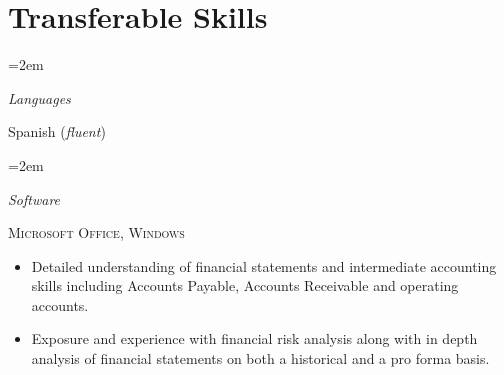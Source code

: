 \documentclass[paper=a4,fontsize=10pt]{scrartcl} %
\newlength{\spacebox}
\newcommand{\PersonalEntry}[2]{
		\noindent\hangindent=2em\hangafter=0 %
		\parbox{\spacebox}{        %
		\textit{#1}}		       %
		\hspace{1.5em} #2 \par}    %
\newcommand{\SkillsEntry}[2]{      %
		\noindent\hangindent=2em\hangafter=0 %
		\parbox{\spacebox}{        %
		\textit{#1}}			   %
		\hspace{1.5em} #2 \par}    %
\begin{document}
\section*{Transferable Skills}{}

\SkillsEntry{Languages}{Spanish  (\textit{fluent})}

\SkillsEntry{Software}{\textsc{Microsoft Office}, \textsc{Windows}}

\begin{itemize}[leftmargin=+.1in]
\item Detailed understanding of financial statements and intermediate accounting skills including Accounts Payable, Accounts Receivable and operating accounts.
\item Exposure and experience with financial risk analysis along with in depth analysis of financial statements on both a historical and a pro forma basis.
\end{itemize}

\end{document}
